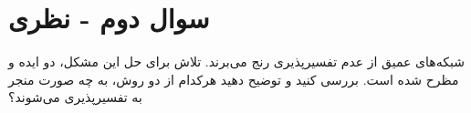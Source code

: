 \section{سوال دوم - نظری}


شبکه‌های عمیق از عدم تفسیر‌پذیری رنج می‌برند. تلاش برای حل این مشکل، دو ایده  و  مظرح شده است. بررسی کنید و توضیح دهید هرکدام از دو روش، به چه صورت منجر به تفسیرپذیری می‌شوند؟



